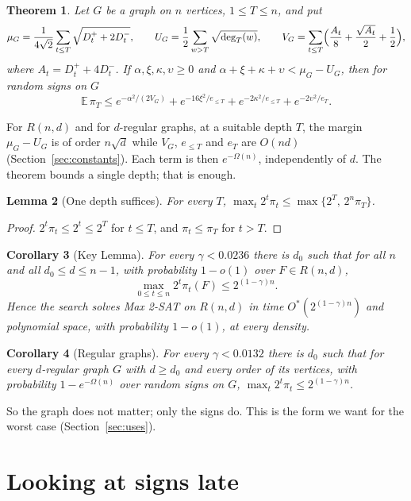 \documentclass[11pt,a4paper]{article}
\newtheorem{theorem}{Theorem}
\newtheorem{lemma}[theorem]{Lemma}
\newtheorem{corollary}[theorem]{Corollary}
\theoremstyle{remark}
\newcommand{\Ostar}{O^{*}}
\newcommand{\E}{\mathbb{E}}
\begin{document}
\begin{theorem}\label{thm:main}
Let $G$ be a graph on $n$ vertices, $1\le T\le n$, and put
\[
 \mu_G=\frac1{4\sqrt2}\sum_{t\le T}\sqrt{D^+_t+2D^-_t},\qquad
 U_G=\frac12\sum_{w>T}\sqrt{\deg_T(w)},\qquad
 V_G=\sum_{t\le T}\Bigl(\frac{A_t}8+\frac{\sqrt{A_t}}2+\frac12\Bigr),
\]
where $A_t=D^+_t+4D^-_t$. If $\alpha,\xi,\kappa,\upsilon\ge0$ and
$\alpha+\xi+\kappa+\upsilon<\mu_G-U_G$, then for random signs on $G$
\[
 \E\,\pi_T\le e^{-\alpha^2/(2V_G)}+e^{-16\xi^2/e_{\le T}}
 +e^{-2\kappa^2/e_{\le T}}+e^{-2\upsilon^2/e_T}.
\]
\end{theorem}

For $R(n,d)$ and for $d$-regular graphs, at a suitable depth $T$, the
margin $\mu_G-U_G$ is of order $n\sqrt d$ while $V_G$, $e_{\le T}$ and $e_T$
are $O(nd)$ (Section~\ref{sec:constants}). Each term is then
$e^{-\Omega(n)}$, independently of $d$. The theorem bounds a
single depth; that is enough.

\begin{lemma}[One depth suffices]\label{lem:onedepth}
For every $T$, $\max_t2^t\pi_t\le\max\{2^T,\,2^n\pi_T\}$.
\end{lemma}

\begin{proof}
$2^t\pi_t\le2^t\le2^T$ for $t\le T$, and $\pi_t\le\pi_T$ for $t>T$.
\end{proof}

\begin{corollary}[Key Lemma]\label{cor:key}
For every $\gamma<0.0236$ there is $d_0$ such that for all $n$ and all
$d_0\le d\le n-1$, with probability $1-o(1)$ over $F\in R(n,d)$,
\[
 \max_{0\le t\le n}2^t\pi_t(F)\le2^{(1-\gamma)n}.
\]
Hence the search solves Max 2-SAT on $R(n,d)$ in time $\Ostar(2^{(1-\gamma)n})$
and polynomial space, with probability $1-o(1)$, at every density.
\end{corollary}

\begin{corollary}[Regular graphs]\label{cor:regular}
For every $\gamma<0.0132$ there is $d_0$ such that for every $d$-regular graph
$G$ with $d\ge d_0$ and every order of its vertices, with probability
$1-e^{-\Omega(n)}$ over random signs on $G$,
$\max_t2^t\pi_t\le2^{(1-\gamma)n}$.
\end{corollary}

So the graph does not matter; only the signs do. This is the form we want for
the worst case (Section~\ref{sec:uses}).

\section{Looking at signs late}\label{sec:late}
\end{document}
